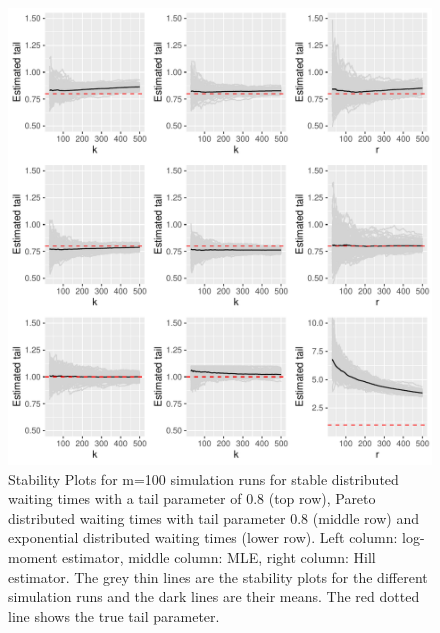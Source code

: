 \documentclass[]{elsarticle} %
\begin{document}
\begin{figure}

{\centering \includegraphics[width=1\linewidth]{article_springer_files/figure-latex/TailSimuplots-1} 

}

\caption{\label{Fig:TailSimu} Stability Plots for m=100 simulation runs for stable distributed waiting times with a tail parameter of 0.8 (top row), Pareto distributed waiting times with tail parameter 0.8 (middle row) and exponential distributed waiting times (lower row). Left column: log-moment estimator, middle column: MLE, right column: Hill estimator. The grey thin lines are the stability plots for the different simulation runs and the dark lines are their means. The red dotted line shows the true tail parameter. }\label{fig:TailSimuplots}
\end{figure}
\end{document}
